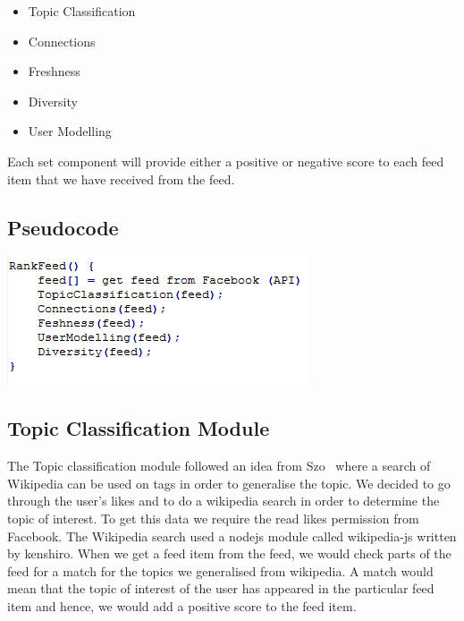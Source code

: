 \begin{itemize}
	\item Topic Classification
	\item Connections
	\item Freshness
	\item Diversity
	\item User Modelling
\end{itemize}

Each set component will provide either a positive or negative score to each feed item that we have received from the feed.

\subsection{Pseudocode}

\begin{center}
\includegraphics[scale=0.8]{images/allPseudo.png}
\end{center}

\subsection{Topic Classification Module}
The Topic classification module followed an idea from Szo~\cite{szomszor2008semantic} where a search of Wikipedia can be used on tags in order to generalise the topic. We decided to go through the user's likes and to do a wikipedia search in order to determine the topic of interest. To get this data we require the read likes permission from Facebook. The Wikipedia search used a nodejs module called wikipedia-js written by kenshiro. When we get a feed item from the feed, we would check parts of the feed for a match for the topics we generalised from wikipedia. A match would mean that the topic of interest of the user has appeared in the particular feed item and hence, we would add a positive score to the feed item.

